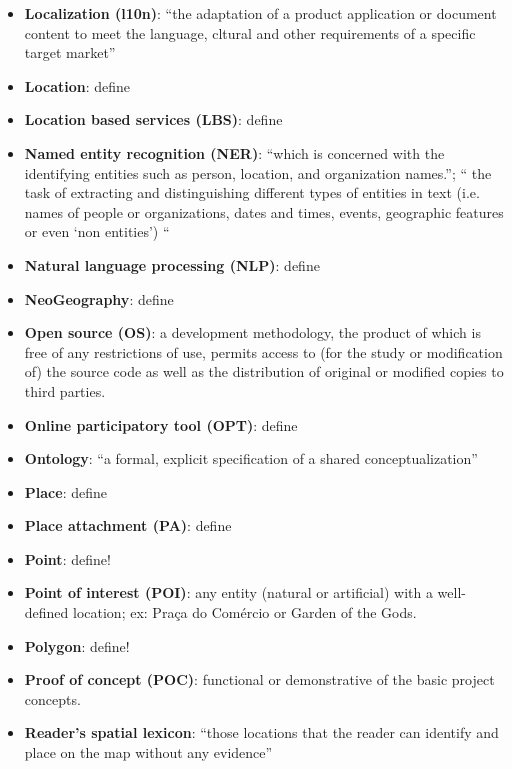 \begin{itemize}
	\item[] \textbf{Localization (l10n)}: {``the adaptation of a product application or document content to meet the language, cltural and other requirements of a specific target market''\cite{Ishida2005}}
	\item[] \textbf{Location}: {\color{red} define}
	\item[] \textbf{Location based services (LBS)}: {\color{red} define}
	\item[] \textbf{Named entity recognition (NER)}: {“which is concerned with the identifying entities such as person, location, and organization names.”\cite{Teitler2008}}; {`` the task of extracting and distinguishing different types of entities in text (i.e. names of people or organizations, dates and times, events, geographic features or even ‘non entities’) `` \cite{Silva2006}}
	\item[] \textbf{Natural language processing (NLP)}: {\color{red}define}
	\item[] \textbf{NeoGeography}: {\color{red}define} \cite{Painho2013}
	\item[] \textbf{Open source (OS)}: a development methodology, the product of which is free of any restrictions of use, permits access to (for the study or modification of) the source code as well as the distribution of original or modified copies to third parties.
	\item[] \textbf{Online participatory tool (OPT)}: {\color{red} define} \cite{Afzalan2017}
	\item[] \textbf{Ontology}: ``a formal, explicit specification of a shared conceptualization'' \cite{Xing2015}
	\item[] \textbf{Place}: {\color{red} define}
	\item[] \textbf{Place attachment (PA)}: {\color{red} define} \cite{Acedo2019}
	\item[] \textbf{Point}: {\color{red} define!}
	\item[] \textbf{Point of interest (POI)}: any entity (natural or artificial) with a well-defined location; ex: Praça do Comércio or Garden of the Gods.
	\item[] \textbf{Polygon}: {\color{red} define!}
	\item[] \textbf{Proof of concept (POC)}: functional or demonstrative of the basic project concepts. \cite{Acedo2019}
	\item[] \textbf{Reader's spatial lexicon}: {``those locations that the reader can identify and place on the map without any evidence'' \cite{Lieberman2010}}

\end{itemize}
